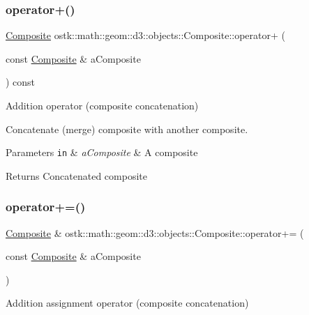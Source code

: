 \subsubsection{\texorpdfstring{operator+()}{operator+()}}
{\footnotesize\ttfamily \hyperlink{classostk_1_1math_1_1geom_1_1d3_1_1objects_1_1_composite}{Composite} ostk\+::math\+::geom\+::d3\+::objects\+::\+Composite\+::operator+ (\begin{DoxyParamCaption}\item[{const \hyperlink{classostk_1_1math_1_1geom_1_1d3_1_1objects_1_1_composite}{Composite} \&}]{a\+Composite }\end{DoxyParamCaption}) const}



Addition operator (composite concatenation) 

Concatenate (merge) composite with another composite.


\begin{DoxyParams}[1]{Parameters}
\mbox{\tt in}  & {\em a\+Composite} & A composite \\
\hline
\end{DoxyParams}
\begin{DoxyReturn}{Returns}
Concatenated composite 
\end{DoxyReturn}
\mbox{\label{classostk_1_1math_1_1geom_1_1d3_1_1objects_1_1_composite_aca2c415b82aee0b6acfae16675f1391e}} 
\subsubsection{\texorpdfstring{operator+=()}{operator+=()}}
{\footnotesize\ttfamily \hyperlink{classostk_1_1math_1_1geom_1_1d3_1_1objects_1_1_composite}{Composite} \& ostk\+::math\+::geom\+::d3\+::objects\+::\+Composite\+::operator+= (\begin{DoxyParamCaption}\item[{const \hyperlink{classostk_1_1math_1_1geom_1_1d3_1_1objects_1_1_composite}{Composite} \&}]{a\+Composite }\end{DoxyParamCaption})}



Addition assignment operator (composite concatenation) 

